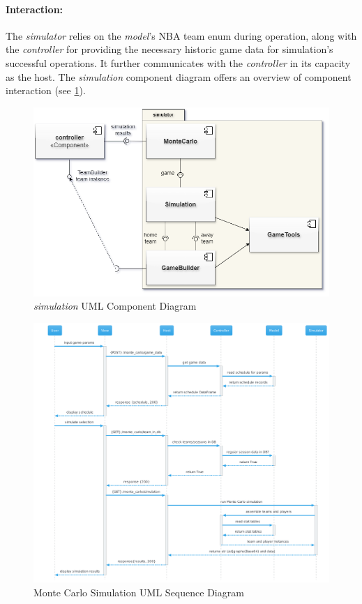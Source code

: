 \documentclass{thesis-ekf}
\theoremstyle{definition}
\theoremstyle{remark}
\begin{document}
{\paragraph{Interaction:}
The \emph{simulator} relies on the \emph{model}'s NBA team enum during operation, along with the \emph{controller} for providing the necessary historic game data for simulation's successful operations. It further communicates with the \emph{controller} in its capacity as the host. The \emph{simulation} component diagram offers an overview of component interaction (see \ref{img-simulation-component}).
\begin{figure}[th!]
	\centering
	\includegraphics[width=0.7\linewidth]{img/component/component_simulation}
	\caption{\emph{simulation} UML Component Diagram}
	\label{img-simulation-component}
\end{figure}
\begin{figure}[th!]
	\centering
	\includegraphics[width=1\linewidth]{img/sequence/monte_carlo/monte_carlo_sequence_cerulean}
	\caption{Monte Carlo Simulation UML Sequence Diagram}
	\label{img-monte-carlo-sequence}
\end{figure}


}
\end{document}
